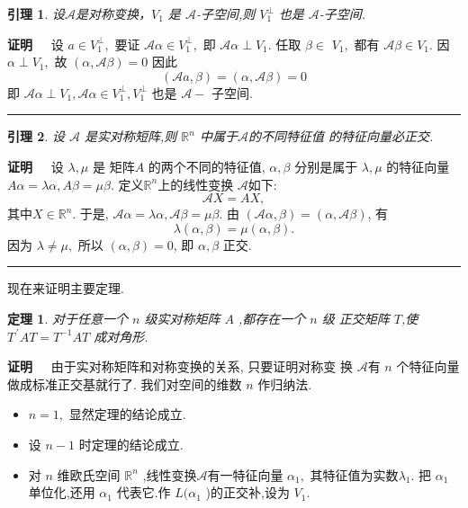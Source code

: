 \documentclass[13pt]{beamer}
\newtheorem{thm}{定理}
\newtheorem{lem}{引理}
\def\qed{\nopagebreak\hfill{\rule{4pt}{7pt}}\medbreak}
\def\pf{{\bf 证明~~ }}
\def\Rn{\mathbb{R}^n}
\def\A{\mathscr{A}}
\def\a{\alpha}
\begin{document}
\begin{frame}
\begin{lem}
设$\mathscr{A}$是对称变换，$V_1$ 是 $\mathscr{A}$-子空间,则 $V_{1}^{\perp}$ 也是
$\mathscr{A}$-子空间. 
\end{lem}

\pf 
设 ${a} \in V_{1}^{\perp},$ 要证 $\mathscr{A} {\alpha} \in V_{1}^{\perp},$ 即 $\mathscr{A} {\alpha} \perp V_{1} .$ 任取 ${\beta} \in$
$V_{1},$ 都有 $\mathscr{A} {\beta} \in V_{1} .$ 因 ${\alpha} \perp V_{1},$ 故 $({\alpha}, \mathscr{A} {\beta})=0$
因此
\[
(\mathscr{A} {a}, {\beta})=({\alpha}, \mathscr{A} {\beta})=0
\]
即 $\mathscr{A} {\alpha} \perp V_{1}, \mathscr{A} {\alpha} \in V_{1}^{\perp}, V_{1}^{\perp}$ 也是 $\mathscr{A}-$ 子空间.
\qed
\end{frame}

\begin{frame}
\begin{lem}
设 $\mathscr{A} $ 是实对称短阵,则 $\Rn$ 中属于$\mathscr{A} $的不同特征值 的特征向量必正交.
\end{lem}
\pf 
设 $\lambda, \mu$ 是 矩阵$A$ 的两个不同的特征值, ${\alpha}, {\beta}$ 分别是属于
$\lambda, \mu$ 的特征向量 $ A {\alpha}=\lambda {\alpha}, {A} {\beta}=\mu {\beta}$. 
定义$\Rn$上的线性变换 $\A$如下: $$\A X=AX,$$ 其中$X \in \Rn$. 
于是,
$\mathscr{A} {\alpha}=\lambda {\alpha}, \mathscr{A} {\beta}=\mu {\beta}$.
由 $(\mathscr{A} {\alpha}, {\beta})=({\alpha}, \mathscr{A} {\beta})$, 有
\[
\lambda({\alpha}, {\beta})=\mu({\alpha}, {\beta}).
\]
因为 $\lambda \neq \mu,$ 所以 $({\alpha}, {\beta})=0$, 即 ${\alpha}, {\beta}$ 正交.
\qed
\end{frame}


\begin{frame}
现在来证明主要定理.
\begin{thm}
对于任意一个 $n$ 级实对称矩阵 $A$ ,都存在一个 $n$ 级 正交矩阵 $T$,使$T^{\, \prime}AT = T ^{-1} {A T}$ 成对角形. 
\end{thm}
\pf 
由于实对称矩阵和对称变换的关系, 只要证明对称变 换 $\A$有 $n$ 个特征向量做成标准正交基就行了. 我们对空间的维数 $n$ 作归纳法.
\begin{itemize}
\item $n=1,$ 显然定理的结论成立. 
\item 设 $n-1$ 时定理的结论成立.
\item 对 $n$ 维欧氏空间 $\Rn$ ,线性变换$\A$有一特征向量 ${\alpha}_{1},$ 其特征值为实数$\lambda_{1} .$  把 ${\alpha}_{1}$ 单位化,还用 ${\alpha}_{1}$
代表它.作 $L ( {\a}_{1}$ )的正交补,设为 $V_{1}.$ 
\end{itemize}

\end{frame}
\end{document}
